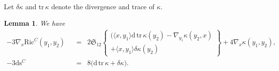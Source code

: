 \documentclass[11pt,a4paper]{article}
\theoremstyle{plain}
\newtheorem{lemma}{Lemma}
\theoremstyle{remark}
\newcommand{\cyclic}{\mathfrak{S}}
\newcommand{\Ric}{\mathrm{Ric}}
\renewcommand{\d}{\mathrm{d}}
\newcommand{\trace}{\mathrm{tr}}
\newcommand{\scal}{\mathrm{s}}
\begin{document}
Let $\delta\kappa$ and $\trace \, \kappa$ denote the divergence and trace of $\kappa$. 

\bigskip
\begin{lemma}
We have
\begin{align}\label{eq:kovariante_Ableitung_des_Ricci_tensors_von_C}
- 3 \nabla_{x} \Ric^C(y_1,y_2) &\;\;=\;\;2 \cyclic_{12}\left \lbrace  \begin{array}{c}\big (\langle x,y_1\rangle \d \, \trace \, \kappa(y_2) - \nabla_{y_1} \kappa(y_2,x)\\
+\langle x,y_1\rangle \delta\kappa(y_2) \end{array} \right \rbrace + 4 \nabla_x \kappa(y_1,y_2),\\
\label{eq:differential_der_skalaren_spur_von_C}
 - 3\d \scal^C &\;\;=\;\;8\big (\d\, \trace \, \kappa + \delta\kappa \big ).
\end{align}
\end{lemma}
\end{document}
